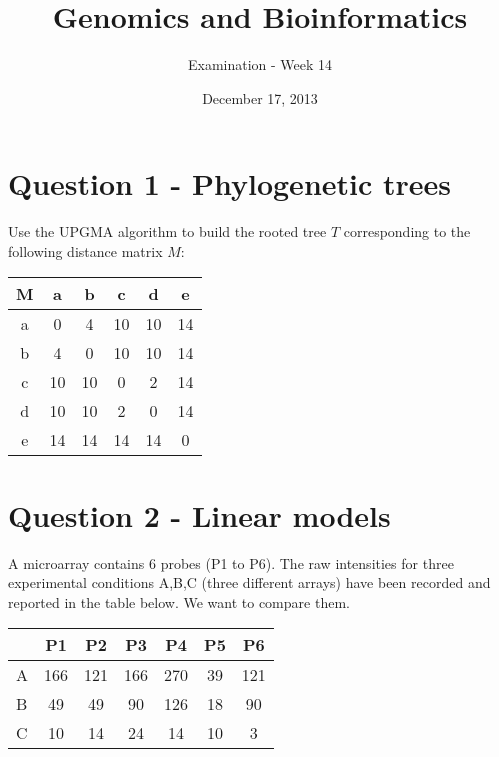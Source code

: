 \documentclass[a4paper,11pt]{article}
\title{Genomics and Bioinformatics}
\date{December 17, 2013}
\author{Examination - Week 14}
\begin{document}
\maketitle

\section*{Question 1 - Phylogenetic trees}

\noindent Use the UPGMA algorithm to build the rooted tree $T$ corresponding to the following distance matrix $M$:

\begin{table}[h!]
\begin{center}
\begin{tabular}{|c|c|c|c|c|c|}
\hline
 M & a & b & c & d & e\\
\hline
a & 0 & 4 & 10 & 10 & 14\\
\hline
b & 4 & 0 & 10 & 10 & 14\\
\hline
c & 10 & 10 & 0 & 2 & 14\\
\hline
d & 10 & 10 & 2 & 0 & 14\\
\hline
e & 14 & 14 & 14 & 14 & 0\\
 \hline
\end{tabular}
\end{center}
\end{table}

\section*{Question 2 - Linear models}

\noindent A microarray contains 6 probes (P1 to P6).
The raw intensities for three experimental conditions A,B,C (three
different arrays) have been recorded and reported in the table
below. We want to compare them.

\begin{table}[h!]
\centering
\begin{tabular}{l | cccccc}
   & P1 & P2 & P3 & P4 & P5 & P6\\
\hline
A & 166 & 121 & 166 & 270 & 39 & 121 \\
B & 49   & 49   & 90 & 126 & 18 & 90 \\
C & 10   & 14   & 24 & 14   & 10 & 3 \\  
\end{tabular}
\end{table}
\end{document}
